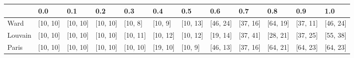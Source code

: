 \begin{tabular}{llllllllllll}
\toprule
{} &       0.0 &       0.1 &       0.2 &       0.3 &       0.4 &       0.5 &       0.6 &       0.7 &       0.8 &       0.9 &       1.0 \\
\midrule
Ward    &  [10, 10] &  [10, 10] &  [10, 10] &   [10, 8] &   [10, 9] &  [10, 13] &  [46, 24] &  [37, 16] &  [64, 19] &  [37, 11] &  [46, 24] \\
Louvain &  [10, 10] &  [10, 10] &  [10, 10] &  [10, 11] &  [10, 12] &  [10, 12] &  [19, 14] &  [37, 41] &  [28, 21] &  [37, 25] &  [55, 38] \\
Paris   &  [10, 10] &  [10, 10] &  [10, 10] &  [10, 10] &  [19, 10] &   [10, 9] &  [46, 13] &  [37, 16] &  [64, 21] &  [64, 23] &  [64, 23] \\
\bottomrule
\end{tabular}
